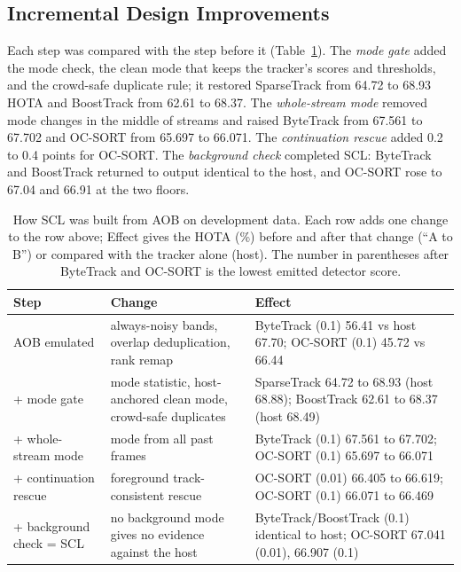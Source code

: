 \subsection{Incremental Design Improvements}\label{sec:scl-steps}
Each step was compared with the step before it (Table~\ref{tab:scl-ablation}). The \emph{mode gate} added the mode check, the clean mode that keeps the tracker's scores and thresholds, and the crowd-safe duplicate rule; it restored SparseTrack from 64.72 to 68.93 HOTA and BoostTrack from 62.61 to 68.37. The \emph{whole-stream mode} removed mode changes in the middle of streams and raised ByteTrack from 67.561 to 67.702 and OC-SORT from 65.697 to 66.071. The \emph{continuation rescue} added 0.2 to 0.4 points for OC-SORT. The \emph{background check} completed SCL: ByteTrack and BoostTrack returned to output identical to the host, and OC-SORT rose to 67.04 and 66.91 at the two floors.

\begin{table}[tbp]
\centering
\caption{How SCL was built from AOB on development data. Each row adds one change to the row above; Effect gives the HOTA (\%) before and after that change (``A to B'') or compared with the tracker alone (host). The number in parentheses after ByteTrack and OC-SORT is the lowest emitted detector score.}
\label{tab:scl-ablation}
\begin{tabular}{>{\raggedright\arraybackslash}p{3.2cm}>{\raggedright\arraybackslash}p{4.2cm}>{\raggedright\arraybackslash}p{6.3cm}}
\toprule
Step & Change & Effect\\
\midrule
AOB emulated & always-noisy bands, overlap deduplication, rank remap & ByteTrack (0.1) 56.41 vs host 67.70; OC-SORT (0.1) 45.72 vs 66.44\\
+ mode gate & mode statistic, host-anchored clean mode, crowd-safe duplicates & SparseTrack 64.72 to 68.93 (host 68.88); BoostTrack 62.61 to 68.37 (host 68.49)\\
+ whole-stream mode & mode from all past frames & ByteTrack (0.1) 67.561 to 67.702; OC-SORT (0.1) 65.697 to 66.071\\
+ continuation rescue & foreground track-consistent rescue & OC-SORT (0.01) 66.405 to 66.619; OC-SORT (0.1) 66.071 to 66.469\\
+ background check = SCL & no background mode gives no evidence against the host & ByteTrack/BoostTrack (0.1) identical to host; OC-SORT 67.041 (0.01), 66.907 (0.1)\\
\bottomrule
\end{tabular}
\end{table}

